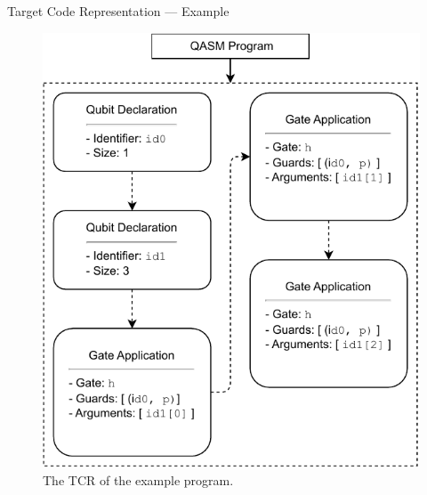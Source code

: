 \begin{frame}{Target Code Representation --- Example}
\begin{minipage}{.45\textwidth}
\begin{figure}[htp]
            \includegraphics[]{../figures/drawio/codeGen_targetCode_example.pdf}
            \caption{The TCR of the example program.}
        \end{figure}
    \end{minipage}
\end{frame}

